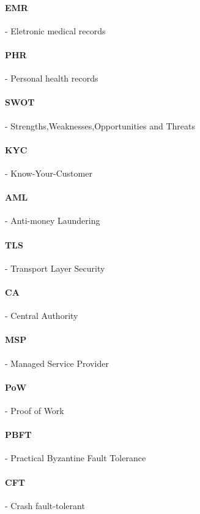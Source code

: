 \paragraph{EMR} - Eletronic medical records

\paragraph{PHR} - Personal health records

\paragraph{SWOT} - Strengths,Weaknesses,Opportunities and Threats

\paragraph{KYC} - Know-Your-Customer

\paragraph{AML} - Anti-money Laundering

\paragraph{TLS} - Transport Layer Security

\paragraph{CA} - Central Authority

\paragraph{MSP} - Managed Service Provider

\paragraph{PoW} - Proof of Work

\paragraph{PBFT} - Practical Byzantine Fault Tolerance

\paragraph{CFT} - Crash fault-tolerant

